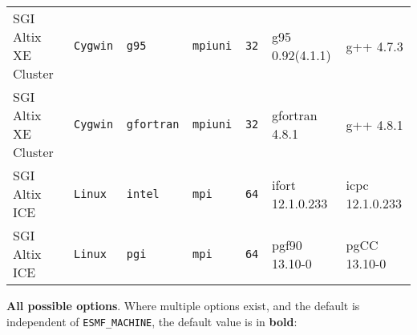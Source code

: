 \begin{longtable}{lllllll}
SGI Altix XE Cluster  &\tt Cygwin &\tt g95          &\tt mpiuni     &\tt 32              & g95 \footnotesize 0.92(4.1.1)      & g++  \footnotesize 4.7.3        \\ %
SGI Altix XE Cluster  &\tt Cygwin &\tt gfortran     &\tt mpiuni     &\tt 32              & gfortran \footnotesize 4.8.1       & g++  \footnotesize 4.8.1        \\ %
SGI Altix ICE         &\tt Linux  &\tt intel        &\tt mpi        &\tt 64              & ifort \footnotesize 12.1.0.233     & icpc \footnotesize 12.1.0.233   \\ %
SGI Altix ICE         &\tt Linux  &\tt pgi          &\tt mpi        &\tt 64              & pgf90 \footnotesize 13.10-0        & pgCC \footnotesize 13.10-0         %
\end{longtable}

\vspace{1ex}

{\bf All possible options}. Where multiple options exist, and the default is independent
of {\tt ESMF\_MACHINE}, the default value is in {\bf bold}:

\vspace{1ex}


